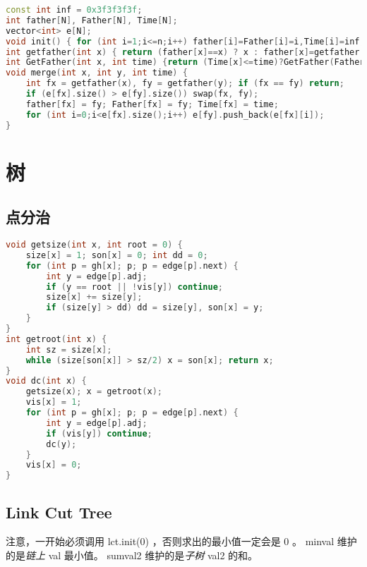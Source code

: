 \documentclass{article}
\begin{document}
\begin{lstlisting}[language=C++]
const int inf = 0x3f3f3f3f;
int father[N], Father[N], Time[N];
vector<int> e[N];
void init() { for (int i=1;i<=n;i++) father[i]=Father[i]=i,Time[i]=inf,e[i].clear(),e[i].push_back(i);}
int getfather(int x) { return (father[x]==x) ? x : father[x]=getfather(father[x]); }
int GetFather(int x, int time) {return (Time[x]<=time)?GetFather(Father[x],time):x;}
void merge(int x, int y, int time) {
	int fx = getfather(x), fy = getfather(y); if (fx == fy) return;
	if (e[fx].size() > e[fy].size()) swap(fx, fy);
	father[fx] = fy; Father[fx] = fy; Time[fx] = time;
	for (int i=0;i<e[fx].size();i++) e[fy].push_back(e[fx][i]);
}
\end{lstlisting}

\section{树}

\subsection{点分治}
\begin{lstlisting}[language=C++]
void getsize(int x, int root = 0) {
	size[x] = 1; son[x] = 0; int dd = 0;
	for (int p = gh[x]; p; p = edge[p].next) {
		int y = edge[p].adj;
		if (y == root || !vis[y]) continue;
		size[x] += size[y];
		if (size[y] > dd) dd = size[y], son[x] = y;
	}
}
int getroot(int x) {
	int sz = size[x];
	while (size[son[x]] > sz/2)	x = son[x]; return x;
}
void dc(int x) {
	getsize(x); x = getroot(x);
	vis[x] = 1;
	for (int p = gh[x]; p; p = edge[p].next) {
		int y = edge[p].adj;
		if (vis[y]) continue;
		dc(y);
	}
	vis[x] = 0;
}
\end{lstlisting}
\subsection{Link Cut Tree}

 注意，一开始必须调用 lct.init(0) ，否则求出的最小值一定会是 0 。
 minval 维护的是\emph{链上} val 最小值。
 sumval2 维护的是\emph{子树} val2 的和。
\end{document}
